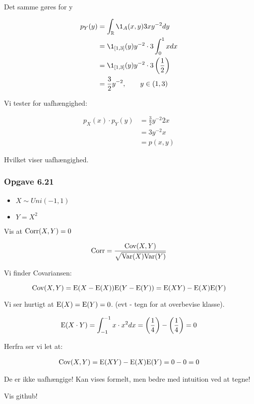 Det samme gøres for y

\begin{align}
    p_Y(y) &= \int_\R \1_A (x,y) 3xy^{-2}dy \\
    &= \1_{[1, 3]}(y) y^{-2} \cdot 3\int_{0}^{1} x dx \\
    &= \1_{[1, 3]}(y)y^{-2} \cdot 3 \lp \frac{1}{2} \rp \\
    &= \frac{3}{2}y^{-2}, \qquad y\in(1,3)
\end{align}

Vi tester for uafhængighed:

\begin{align}
    p_X(x) \cdot p_Y(y) &= \frac{3}{2}y^{-2}2x \\
    &= 3 y^{-2}x \\
    &= p(x,y)
\end{align}


Hvilket viser uafhængighed.
 
\subsubsection{Opgave 6.21}

\begin{itemize}
    \item $X \sim Uni(-1, 1)$
    \item $Y=X^2$
\end{itemize}

Vis at $\text{Corr}(X, Y) = 0$

\begin{equation}
    \text{Corr} = \frac{\text{Cov}(X,Y)}{\sqrt{\text{Var}(X)\text{Var}(Y)}}        
\end{equation}

Vi finder Covariansen:

\begin{equation}
    \text{Cov}(X,Y) = \text{E}(X - \text{E}(X))\text{E}(Y - \text{E}(Y)) = \text{E}(X Y) - \text{E}(X)\text{E}(Y)
\end{equation}

Vi ser hurtigt at  $\text{E}(X) = \text{E}(Y) = 0$.
(evt - tegn for at overbevise klasse).

\begin{equation}
    \text{E}(X \cdot Y) = \int_{-1}^{-1} x \cdot x^2 dx = \left( \frac{1}{4} \right) - \left( \frac{1}{4} \right) = 0
\end{equation}

Herfra ser vi let at:

\begin{align}
    \text{Cov}(X,Y) = \text{E}(X Y) - \text{E}(X)\text{E}(Y) = 0 - 0 = 0
\end{align}

De er ikke uafhængige! Kan vises formelt, men bedre med intuition ved at tegne!

Vis github!
